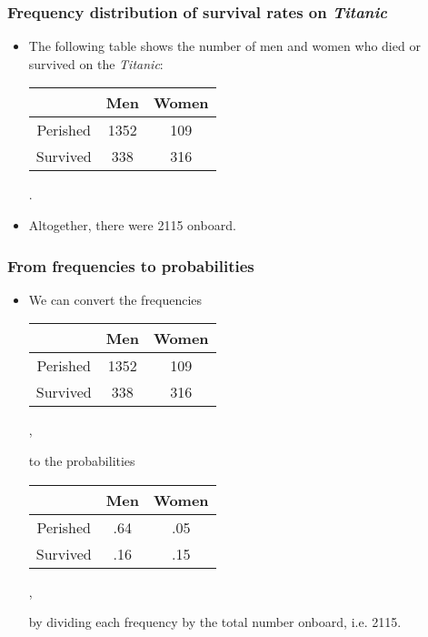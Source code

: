 \documentclass[10pt,xcolor=dvipsnames,serif,professionalfont]{beamer} %
\begin{document}
\begin{frame}
\frametitle{Frequency distribution of survival rates on \emph{Titanic}}
\begin{itemize}
\item The following table shows the number of men and women who died or survived on the \emph{Titanic}:

\begin{center}
\begin{table}
\begin{tabular}{c|cc}
& Men & Women \\\hline
Perished & 1352 & 109 \\
Survived & 338 & 316 \\
\end{tabular}.
\end{table}
\end{center}
\item Altogether, there were 2115 onboard.
\end{itemize}
\end{frame}



\begin{frame}
\frametitle{From frequencies to probabilities}
\begin{itemize}
\item We can convert the frequencies 
\begin{center}
\begin{tabular}{c|cc}
& Men & Women \\\hline
Perished & 1352 & 109 \\
Survived & 338 & 316 \\
\end{tabular},
\end{center}
to the probabilities 
\begin{center}
\begin{tabular}{c|cc}
& Men & Women \\\hline
Perished & .64 & .05 \\
Survived & .16 & .15 \\
\end{tabular},
\end{center}
by dividing each frequency by the total number onboard, i.e. 2115.
\end{itemize}
\end{frame}
\end{document}
